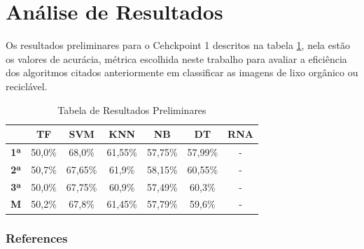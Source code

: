 \documentclass{article}
\begin{document}
\section{Análise de Resultados}
    Os resultados preliminares para o Cehckpoint 1 descritos na tabela \ref{tab:prem_result}, nela estão os valores de acurácia, métrica escolhida neste trabalho para avaliar a eficiência dos algoritmos citados anteriormente em classificar as imagens de lixo orgânico ou reciclável.
    
    
    
\begin{table}[h]
\centering
\begin{tabular}{c|c|c|c|c|c|c|}
\cline{2-7}
\multicolumn{1}{l|}{}                 & \textbf{TF} & \textbf{SVM} & \textbf{KNN} & \textbf{NB} & \textbf{DT} & \textbf{RNA} \\ \hline
\multicolumn{1}{|c|}{\textbf{1ª}} & 50,0\%      & 68,0\%       & 61,55\%      & 57,75\%     & 57,99\%     & -            \\ \hline
\multicolumn{1}{|c|}{\textbf{2ª}} & 50,7\%      & 67,65\%      & 61,9\%       & 58,15\%     & 60,55\%     & -            \\ \hline
\multicolumn{1}{|c|}{\textbf{3ª}} & 50,0\%      & 67,75\%      & 60,9\%       & 57,49\%     & 60,3\%      & -            \\ \hline
\multicolumn{1}{|l|}{\textbf{M}}  & 50,2\%      & 67,8\%       & 61,45\%      & 57,79\%     & 59,6\%      & -            \\ \hline
\end{tabular}
\caption{Tabela de Resultados Preliminares}
\label{tab:prem_result}
\end{table}
    
\subsubsection{References}
\end{document}
